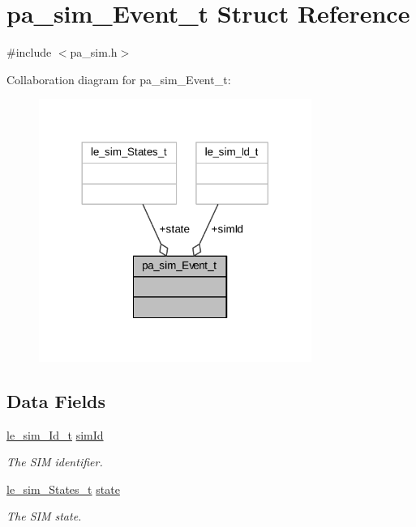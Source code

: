 \hypertarget{structpa__sim___event__t}{}\section{pa\+\_\+sim\+\_\+\+Event\+\_\+t Struct Reference}
\label{structpa__sim___event__t}


{\ttfamily \#include $<$pa\+\_\+sim.\+h$>$}



Collaboration diagram for pa\+\_\+sim\+\_\+\+Event\+\_\+t\+:
\nopagebreak
\begin{figure}[H]
\begin{center}
\leavevmode
\includegraphics[width=252pt]{structpa__sim___event__t__coll__graph}
\end{center}
\end{figure}
\subsection*{Data Fields}
\begin{DoxyCompactItemize}
\item 
\hyperlink{le__sim__interface_8h_aace49df88426119626fb1ef4e544ccdd}{le\+\_\+sim\+\_\+\+Id\+\_\+t} \hyperlink{structpa__sim___event__t_a07e399c7effb335b881f3c72d83f897b}{sim\+Id}
\begin{DoxyCompactList}\small\item\em The S\+IM identifier. \end{DoxyCompactList}\item 
\hyperlink{le__sim__interface_8h_a21b9bb7d5e5e7ece213e00738a5bae41}{le\+\_\+sim\+\_\+\+States\+\_\+t} \hyperlink{structpa__sim___event__t_a636ebff9013587a10afcb348b417536c}{state}
\begin{DoxyCompactList}\small\item\em The S\+IM state. \end{DoxyCompactList}\end{DoxyCompactItemize}



